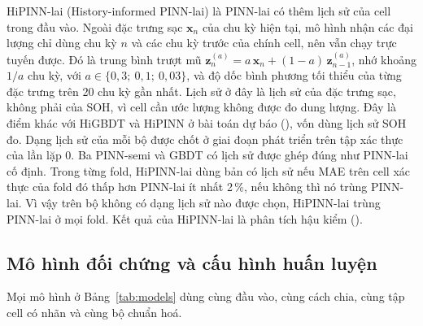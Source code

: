 HiPINN-lai (History-informed PINN-lai) là PINN-lai có thêm lịch sử của cell trong đầu vào. Ngoài đặc trưng sạc
$\mathbf{x}_n$ của chu kỳ hiện tại, mô hình nhận các đại lượng chỉ dùng chu kỳ $n$ và các chu kỳ trước của chính cell, nên
vẫn chạy trực tuyến được. Đó là trung bình trượt mũ $\mathbf{z}^{(a)}_n = a\,\mathbf{x}_n + (1-a)\,\mathbf{z}^{(a)}_{n-1}$,
nhớ khoảng $1/a$ chu kỳ, với $a \in \{0{,}3;\ 0{,}1;\ 0{,}03\}$, và độ dốc bình phương tối thiểu của từng đặc trưng trên 20
chu kỳ gần nhất. Lịch sử ở đây là lịch sử của đặc trưng sạc, không phải của SOH, vì cell cần ước lượng không được đo dung
lượng. Đây là điểm khác với HiGBDT và HiPINN ở bài toán dự báo (), vốn dùng lịch sử SOH đo. Dạng lịch sử
của mỗi bộ được chốt ở giai đoạn phát triển trên tập xác thực của lần lặp 0. Ba PINN-semi và GBDT có lịch sử được ghép
đúng như PINN-lai cố định. Trong từng fold, HiPINN-lai dùng bản có lịch sử nếu MAE trên cell xác thực của fold đó thấp hơn
PINN-lai ít nhất 2\,\%, nếu không thì nó trùng PINN-lai. Vì vậy trên bộ không có dạng lịch sử nào được chọn, HiPINN-lai
trùng PINN-lai ở mọi fold. Kết quả của HiPINN-lai là phân tích hậu kiểm ().

\subsection{Mô hình đối chứng và cấu hình huấn luyện}\label{sec:baselines}

Mọi mô hình ở Bảng~\ref{tab:models} dùng cùng đầu vào, cùng cách chia, cùng tập cell có nhãn và cùng bộ chuẩn hoá.

